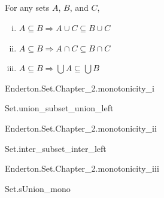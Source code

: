 \documentclass{report}
\begin{document}
\subsection{}%

  For any sets $A$, $B$, and $C$,
    \begin{enumerate}[(i)]
      \item $A \subseteq B \Rightarrow A \cup C \subseteq B \cup C$
      \item $A \subseteq B \Rightarrow A \cap C \subseteq B \cap C$
      \item $A \subseteq B \Rightarrow \bigcup A \subseteq \bigcup B$
    \end{enumerate}

    {Enderton.Set.Chapter\_2.monotonicity\_i}

    {Set.union\_subset\_union\_left}

    {Enderton.Set.Chapter\_2.monotonicity\_ii}

    {Set.inter\_subset\_inter\_left}

    {Enderton.Set.Chapter\_2.monotonicity\_iii}

    {Set.sUnion\_mono}
\end{document}
